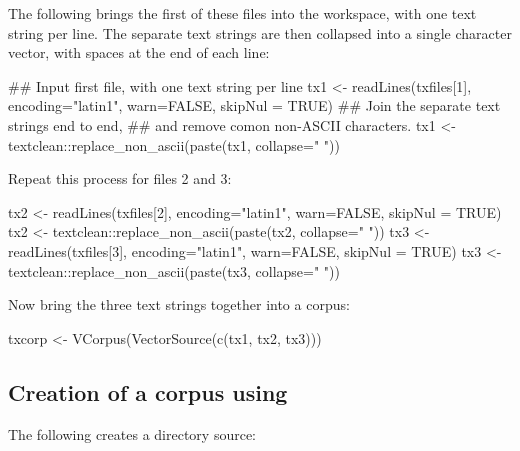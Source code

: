 The following brings the first of these files into the workspace,
with one text string per line. The separate text strings are then
collapsed into a single character vector, with spaces at the end
of each line:
\begin{fullwidth}
\begin{Schunk}
\begin{Sinput}
## Input first file, with one text string per line
tx1 <- readLines(txfiles[1], encoding="latin1", warn=FALSE, 
                 skipNul = TRUE)
## Join the separate text strings end to end,
## and remove comon non-ASCII characters.
tx1 <- textclean::replace_non_ascii(paste(tx1, collapse=" "))
\end{Sinput}
\end{Schunk}
\end{fullwidth}

Repeat this process for files 2 and 3:
\begin{fullwidth}
\begin{Schunk}
\begin{Sinput}
tx2 <- readLines(txfiles[2], encoding="latin1", warn=FALSE, 
                 skipNul = TRUE)
tx2 <- textclean::replace_non_ascii(paste(tx2, collapse=" "))
tx3 <- readLines(txfiles[3], encoding="latin1", warn=FALSE, 
                 skipNul = TRUE)
tx3 <- textclean::replace_non_ascii(paste(tx3, collapse=" "))
\end{Sinput}
\end{Schunk}
\end{fullwidth}

Now bring the three text strings together into a corpus:
\begin{Schunk}
\begin{Sinput}
txcorp <- VCorpus(VectorSource(c(tx1, tx2, tx3)))
\end{Sinput}
\end{Schunk}

\subsection*{Creation of a corpus using }

The following creates a directory source:
\begin{Schunk}
\end{Schunk}

